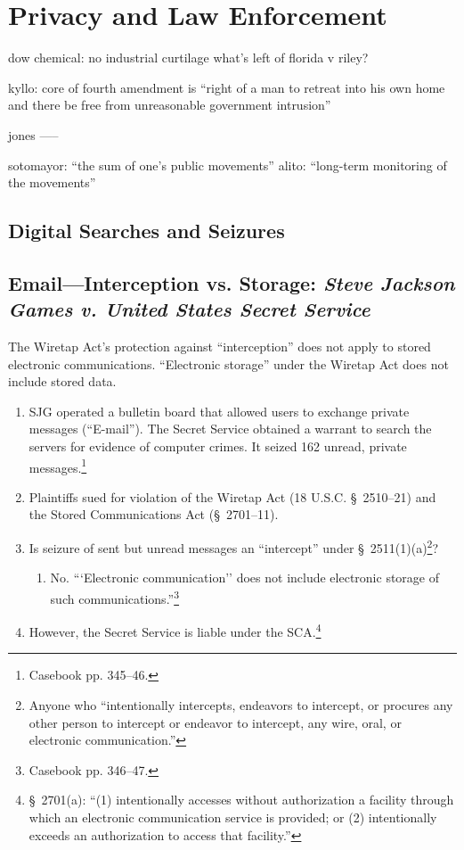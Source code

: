 \section{Privacy and Law Enforcement}


dow chemical: no industrial curtilage
    what's left of florida v riley?

kyllo: core of fourth amendment is ``right of a man to retreat into his own 
home and there be free from unreasonable government intrusion''


jones
-----

sotomayor: ``the sum of one's public movements''
alito: ``long-term monitoring of the movements''


\subsection{Digital Searches and Seizures}

\subsection{Email---Interception vs. Storage: \emph{Steve Jackson Games v. 
United States Secret Service}}

The Wiretap Act's protection against ``interception'' does not apply to 
stored electronic communications. ``Electronic storage'' under the Wiretap Act 
does not include stored data.

\begin{enumerate}
    \item SJG operated a bulletin board that allowed users to exchange private 
    messages (``E-mail''). The Secret Service obtained a warrant to search the 
    servers for evidence of computer crimes. It seized 162 unread, private 
    messages.\footnote{Casebook pp. 345--46.}
    \item Plaintiffs sued for violation of the Wiretap Act (18 U.S.C. \S\ 
    2510--21) and the Stored Communications Act (\S\ 2701--11).
    \item Is seizure of sent but unread messages an ``intercept'' under \S\ 
    2511(1)(a)\footnote{Anyone who ``intentionally intercepts, endeavors to 
    intercept, or procures any other person to intercept or endeavor to 
    intercept, any wire, oral, or electronic communication.''}?
    \begin{enumerate}
        \item No. ```Electronic communication'' does not include electronic 
        storage of such communications.''\footnote{Casebook pp. 346--47.}
    \end{enumerate}
    \item However, the Secret Service is liable under the SCA.\footnote{\S\ 
    2701(a): ``(1) intentionally accesses without authorization a facility 
    through which an electronic communication service is provided; or (2) 
    intentionally exceeds an authorization to access that facility.''}
\end{enumerate}

